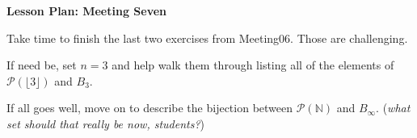 \documentclass[12pt]{amsart}
\theoremstyle{definition}
\begin{document}
\begin{center}
\textbf{\Huge
Lesson Plan: Meeting Seven
}
\end{center}
\vspace{.5in}

Take time to finish the last two exercises from Meeting06.
Those are challenging. 

If need be, set $n=3$ and help walk them through listing all of the elements of $\mathcal{P}(\lfloor 3 \rfloor)$ and $B_3$.

\vspace{.25in}

If all goes well, move on to describe the bijection between $\mathcal{P}(\mathbb{N})$ and $B_{\infty}$. (\textit{what set should that really be now, students?})
\end{document}
